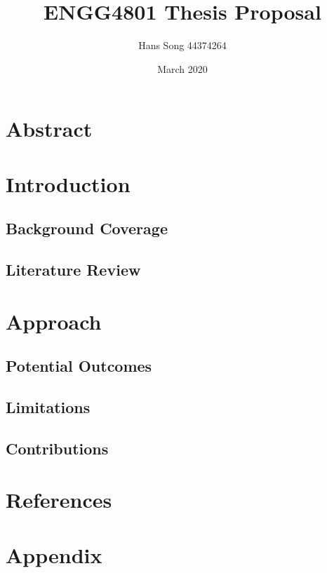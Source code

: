 

\title{ENGG4801 Thesis Proposal}

\author{Hans Song 44374264}

\date{March 2020}



\nocite{*} %

\maketitle

\tableofcontents

\newpage

\section{Abstract}

\section{Introduction}

\subsection{Background Coverage}

\subsection{Literature Review}

\section{Approach}

\subsection{Potential Outcomes}

\subsection{Limitations}

\subsection{Contributions}

\section{References}

\printbibliography

\section{Appendix}


